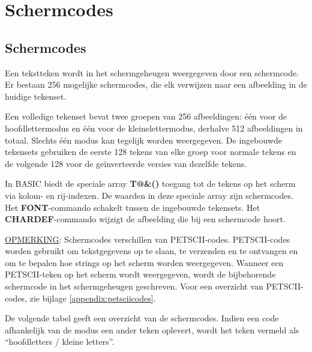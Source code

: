 \chapter{Schermcodes}

\section{Schermcodes}

\label{appendix:screencodes}

Een tekstteken wordt in het schermgeheugen weergegeven door een schermcode. Er bestaan 256 mogelijke schermcodes, die elk verwijzen naar een afbeelding in de huidige tekenset.

Een volledige tekenset bevat twee groepen van 256 afbeeldingen: één voor de hoofdlettermodus en één voor de kleinelettermodus, derhalve 512 afbeeldingen in totaal. Slechts één modus kan tegelijk worden weergegeven. De ingebouwde tekensets gebruiken de eerste 128 tekens van elke groep voor normale tekens en de volgende 128 voor de geïnverteerde versies van dezelfde tekens.

In BASIC biedt de speciale array {\bf T@\&()} toegang tot de tekens op het scherm via kolom- en rij-indexen. De waarden in deze speciale array zijn schermcodes. Het {\bf FONT}-commando schakelt tussen de ingebouwde tekensets. Het {\bf CHARDEF}-commando wijzigt de afbeelding die bij een schermcode hoort.

\underline{OPMERKING}: Schermcodes verschillen van PETSCII-codes. PETSCII-codes worden gebruikt om tekstgegevens op te slaan, te verzenden en te ontvangen en om te bepalen hoe strings op het scherm worden weergegeven. Wanneer een PETSCII-teken op het scherm wordt weergegeven, wordt de bijbehorende schermcode in het schermgeheugen geschreven. Voor een overzicht van PETSCII-codes, zie bijlage \vref{appendix:petsciicodes}.

De volgende tabel geeft een overzicht van de schermcodes. Indien een code afhankelijk van de modus een ander teken oplevert, wordt het teken vermeld als ``hoofdletters / kleine letters''.


